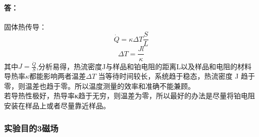 \documentclass{ctexart}
\theoremstyle{ansstyle}
\begin{document}
\begin{enumerate}
          \paragraph{答：}固体热传导：
          $$\dot{Q}=\kappa \Delta T\frac{S}{L}$$
          $$\Delta T=\frac{Jl}{\kappa}$$
          其中$J=\frac{\dot{Q}}{S}$,分析易得，热流密度J与样品和铂电阻的距离L以及样品和电阻的材料导热率$\kappa$都能影响两者温差$\Delta T$
          当等待时间较长，系统趋于稳态，热流密度 J 趋于零，则温差也趋于零。所以温度测量的效率和准确不能兼顾。\\
          若导热性极好，热导率κ趋于无穷，则温差为零，所以最好的办法是尽量将铂电阻安装在样品上或者尽量靠近样品。
\end{enumerate}
\subsubsection{实验目的3磁场}
\end{document}
